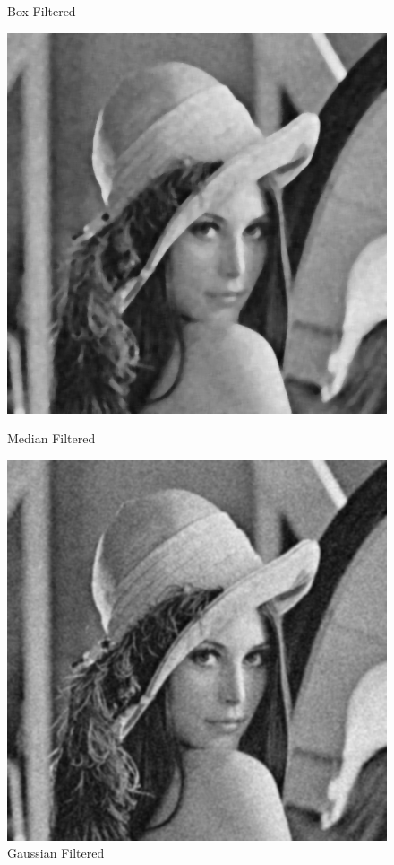 \documentclass[11pt,a4paper]{article}
\begin{document}
\begin{figure}[ht!]
\begin{minipage}{0.3\textwidth}
        \caption{Box Filtered}
    \end{minipage}
    \vskip 4pt
    \begin{minipage}{0.3\textwidth}
        \centering
        \includegraphics[width=\linewidth]{figs/task1/median_filtered.png}
        \caption{Median Filtered}
    \end{minipage}
    \quad
    \begin{minipage}{0.3\textwidth}
        \centering
        \includegraphics[width=\linewidth]{figs/task1/gaussian_filtered.png}
        \caption{Gaussian Filtered}
    \end{minipage}
\end{figure}
\end{document}
